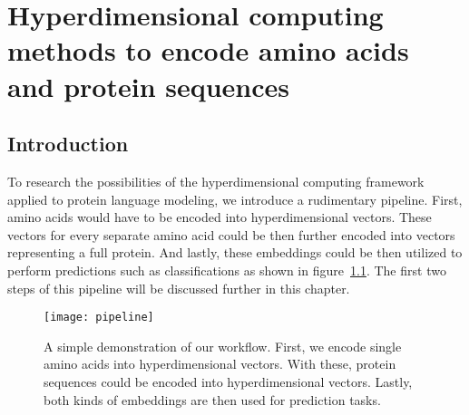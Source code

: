 \chapter[Amino acid and protein encoding]{Hyperdimensional computing methods to encode amino acids and protein sequences}
\section{Introduction}
To research the possibilities of the hyperdimensional computing framework applied to protein language modeling, we introduce a rudimentary pipeline. First, amino acids would have to be encoded into hyperdimensional vectors. These vectors for every separate amino acid could be then further encoded into vectors representing a full protein. And lastly, these embeddings could be then utilized to perform predictions such as classifications as shown in figure~\ref{fig:pipeline}. The first two steps of this pipeline will be discussed further in this chapter.

\begin{figure}[H]
    \centering
    \texttt{[image: pipeline]}
    \caption{A simple demonstration of our workflow. First, we encode single amino acids into hyperdimensional vectors. With these, protein sequences could be encoded into hyperdimensional vectors. Lastly, both kinds of embeddings are then used for prediction tasks.}\label{fig:pipeline}
\end{figure}

